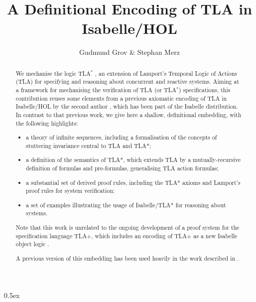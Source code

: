 \documentclass[11pt,a4paper]{article}
\newcommand{\tlastar}{TLA$^{*}$}
\begin{document}
\title{A Definitional Encoding of TLA in Isabelle/HOL}
\author{Gudmund Grov \& Stephan Merz}
\maketitle

\begin{abstract}
We mechanise the logic \tlastar{} \cite{Merz99}, an extension of Lamport's Temporal Logic of Actions (TLA) \cite{Lamport94} for specifying 
and reasoning about concurrent and reactive systems. Aiming at a framework for mechanising the verification
of TLA (or \tlastar{}) specifications, this contribution reuses some elements from a
previous axiomatic encoding of TLA in Isabelle/HOL by the second author \cite{Merz98}, which has been part of the
Isabelle distribution. In contrast to that previous work, we give here a shallow, definitional
embedding, with the following highlights:
\begin{itemize}
\item a theory of infinite sequences, including a formalisation of the concepts of stuttering invariance central to TLA and TLA*;
\item a definition of the semantics of TLA*, which extends TLA by a mutually-recursive definition of formulas and pre-formulas, generalising TLA action formulas;
\item a substantial set of derived proof rules, including the TLA* axioms and Lamport's proof rules for system verification;
\item a set of examples illustrating the usage of Isabelle/TLA* for reasoning about systems.
\end{itemize}
Note that this work is unrelated to the ongoing development of a proof system for the specification language TLA+, 
which includes an encoding of TLA+ as a new Isabelle object logic \cite{chaudhuri:tlaps}.

A previous version of this embedding has been used heavily in the work described in \cite{Grov09}. 
\end{abstract}

\tableofcontents

\parindent 0pt\parskip 0.5ex





\end{document}
